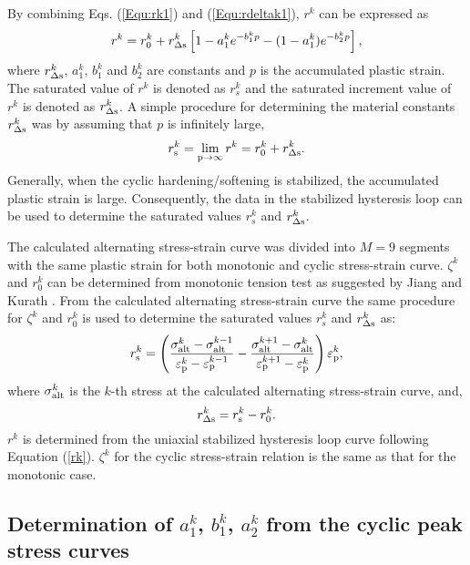By combining Eqs. (\ref{Equ:rk1}) and (\ref{Equ:rdeltak1}), $r^k$ can be expressed as
\begin{equation}\label{rk}
{r^k} = r_0^k + r_{\Delta \rm{s}}^k\left[ {1 - a_1^k{e^{ - b_1^kp}} - (1-a_1^k){e^{ - b_2^kp}} }\right],
\end{equation}
where $r_{\Delta \rm{s}}^k$, $a_1^k$, $b_1^k$ and $b_2^k$ are constants and $p$ is the accumulated plastic strain.
The saturated value of $r^k$ is denoted as $r^k_s$ and the saturated increment value of $r^k$ is denoted as $r^k_{\Delta \rm{s}}$.
A simple procedure for determining the material constants $r_{\Delta \rm{s}}^k$ was by assuming that $p$ is infinitely large,
\begin{equation}
r_{\rm{s}}^k=\mathop {\lim }\limits_{{\rm{p}} \to \infty } {r^k} = r_0^k + r_{\Delta \rm{s}}^k.
\label{Equ:rsk}
\end{equation}
Generally, when the cyclic hardening/softening is stabilized, the accumulated plastic strain is large.
Consequently, the data in the stabilized hysteresis loop can be used to determine the saturated values $r^k_s$ and $r^k_{\Delta \rm{s}}$.

The calculated alternating stress-strain curve was  divided into $M=9$ segments with the same plastic strain for both monotonic and cyclic stress-strain curve.  $\zeta^k$ and $r_0^k$ can be determined from monotonic tension test as suggested by Jiang and Kurath \cite{Jiang1996387}. From the calculated alternating stress-strain curve the same procedure for $\zeta^k$ and $r_0^k$ is used to determine the saturated values $r^k_s$ and $r^k_{\Delta \rm{s}}$ as:
\begin{equation}
r_{\rm{s}}^k = \left( {\frac{{\sigma _{\rm{alt}}^k - \sigma _{\rm{alt}}^{k - 1}}}{{\varepsilon _{\rm{p}}^k - \varepsilon _{\rm{p}}^{k - 1}}} - \frac{{\sigma _{\rm{alt}}^{k + 1} - \sigma _{\rm{alt}}^k}}{{\varepsilon _{\rm{p}}^{k + 1} - \varepsilon _{\rm{p}}^k}}} \right)\varepsilon _{\rm{p}}^k,
\end{equation}
where $\sigma _{\rm{alt}}^k$ is the $k$-th stress at the calculated alternating stress-strain curve, and,
\begin{equation}
r_{\Delta \rm{s}}^k = r_{\rm{s}}^k - r_{0}^k.
\end{equation}
$r^k$ is determined from the uniaxial stabilized hysteresis loop curve following Equation (\ref{rk}). ${\zeta ^k}$ for the cyclic stress-strain relation is the same as that for the monotonic case.

\subsection{Determination of $a_{1}^k$, $b_{1}^k$, $a_{2}^k$ from the cyclic peak stress curves}

